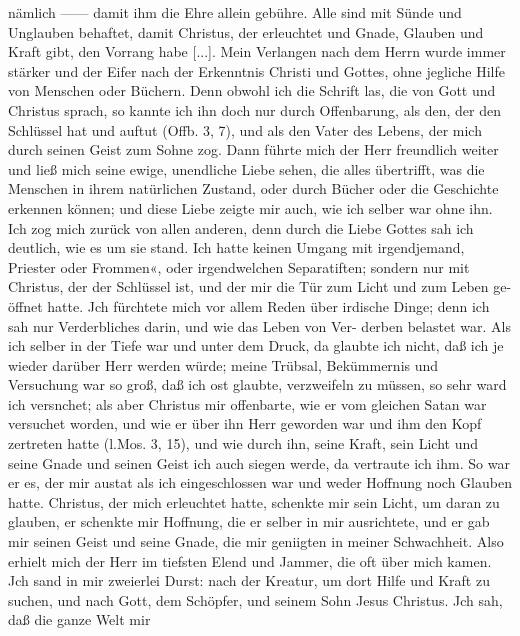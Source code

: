 nämlich —— damit ihm die Ehre allein gebühre. Alle sind mit
Sünde und Unglauben behaftet, damit Christus, der erleuchtet
und Gnade, Glauben und Kraft gibt, den Vorrang habe [...].
Mein Verlangen nach dem Herrn wurde immer stärker und der
Eifer nach der Erkenntnis Christi und Gottes, ohne jegliche Hilfe
von Menschen oder Büchern. Denn obwohl ich die Schrift las,
die von Gott und Christus sprach, so kannte ich ihn doch nur
durch Offenbarung, als den, der den Schlüssel hat und auftut
(Offb. 3, 7), und als den Vater des Lebens, der mich durch seinen
Geist zum Sohne zog. Dann führte mich der Herr freundlich
weiter und ließ mich seine ewige, unendliche Liebe sehen, die
alles übertrifft, was die Menschen in ihrem natürlichen Zustand,
oder durch Bücher oder die Geschichte erkennen können;
und diese Liebe zeigte mir auch, wie ich selber war ohne ihn.
Ich zog mich zurück von allen anderen, denn durch die Liebe
Gottes sah ich deutlich, wie es um sie stand. Ich hatte keinen
Umgang mit irgendjemand, Priester oder Frommen«, oder
irgendwelchen Separatiften; sondern nur mit Christus, der der
Schlüssel ist, und der mir die Tür zum Licht und zum Leben ge-
öffnet hatte. Jch fürchtete mich vor allem Reden über irdische Dinge;
denn ich sah nur Verderbliches darin, und wie das Leben von Ver-
derben belastet war. Als ich selber in der Tiefe war und unter dem
Druck, da glaubte ich nicht, daß ich je wieder darüber Herr werden
würde; meine Trübsal, Bekümmernis und Versuchung war so
groß, daß ich ost glaubte, verzweifeln zu müssen, so sehr ward
ich versnchet; als aber Christus mir offenbarte, wie er vom gleichen
Satan war versuchet worden, und wie er über ihn Herr geworden
war und ihm den Kopf zertreten hatte (l.Mos. 3, 15), und wie durch
ihn, seine Kraft, sein Licht und seine Gnade und seinen Geist ich
auch siegen werde, da vertraute ich ihm. So war er es, der mir
austat als ich eingeschlossen war und weder Hoffnung noch Glauben
hatte. Christus, der mich erleuchtet hatte, schenkte mir sein Licht,
um daran zu glauben, er schenkte mir Hoffnung, die er selber in
mir ausrichtete, und er gab mir seinen Geist und seine Gnade,
die mir geniigten in meiner Schwachheit. Also erhielt mich der
Herr im tiefsten Elend und Jammer, die oft über mich kamen.
Jch sand in mir zweierlei Durst: nach der Kreatur, um dort
Hilfe und Kraft zu suchen, und nach Gott, dem Schöpfer, und
seinem Sohn Jesus Christus. Jch sah, daß die ganze Welt mir



